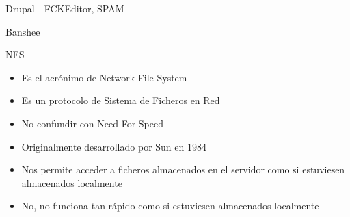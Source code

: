 \documentclass[spanish]{beamer}
\begin{document}
\begin{frame}{Drupal - FCKEditor, SPAM}
\end{frame}
\begin{frame}{Banshee}
\end{frame}
\begin{frame}{NFS}
\begin{itemize}
\item Es el acrónimo de Network File System
\item Es un protocolo de Sistema de Ficheros en Red 
\item No confundir con Need For Speed
\item Originalmente desarrollado por Sun en 1984
\item Nos permite acceder a ficheros almacenados en el servidor como si 
estuviesen almacenados localmente
\item No, no funciona tan rápido como si estuviesen almacenados localmente
\end{itemize}
\end{frame}
\end{document}
